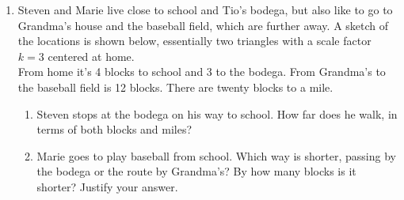 \begin{enumerate}
\newpage
\item Steven and Marie live close to school and Tio's bodega, but also like to go to Grandma's house and the baseball field, which are further away. A sketch of the locations is shown below, essentially two triangles with a scale factor $k=3$ centered at home.\\[0.25cm]
From home it's 4 blocks to school and 3 to the bodega. From Grandma's to the baseball field is 12 blocks. There are twenty blocks to a mile.
\begin{enumerate}
  \item Steven stops at the bodega on his way to school. How far does he walk, in terms of both blocks and miles?
\begin{flushright}
\end{flushright} 
  \item Marie goes to play baseball from school. Which way is shorter, passing by the bodega or the route by Grandma's? By how many blocks is it shorter? Justify your answer.
\end{enumerate}

\end{enumerate}

